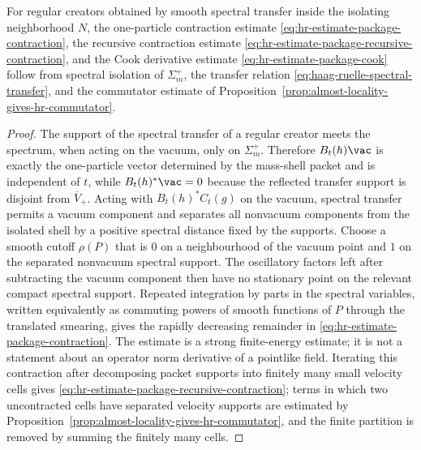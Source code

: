 \begin{proposition}
\label{prop:origin-of-remaining-haag-ruelle-estimates}
For regular creators obtained by smooth spectral transfer inside the
isolating neighborhood \(N\), the one-particle contraction estimate
\eqref{eq:hr-estimate-package-contraction}, the recursive contraction
estimate \eqref{eq:hr-estimate-package-recursive-contraction}, and the Cook
derivative estimate \eqref{eq:hr-estimate-package-cook} follow from spectral
isolation of \(\Sigma_m^+\), the transfer relation
\eqref{eq:haag-ruelle-spectral-transfer}, and the commutator estimate of
Proposition~\ref{prop:almost-locality-gives-hr-commutator}.
\end{proposition}

\begin{proof}
The support of the spectral transfer of a regular creator meets the spectrum,
when acting on the vacuum, only on \(\Sigma_m^+\).  Therefore
\(B_t(h)\vac\) is exactly the one-particle vector determined by the mass-shell
packet and is independent of \(t\), while \(B_t(h)^*\vac=0\) because the
reflected transfer support is disjoint from \(\overline V_+\).  Acting with
\(B_t(h)^*C_t(g)\) on the vacuum, spectral transfer permits a vacuum component
and separates all nonvacuum components from the isolated shell by a positive
spectral distance fixed by the supports.  Choose a smooth cutoff \(\rho(P)\)
that is \(0\) on a neighbourhood of the vacuum point and \(1\) on the
separated nonvacuum spectral support.  The oscillatory factors left after
subtracting the vacuum component then have no stationary point on the relevant
compact spectral support.  Repeated integration by parts in the spectral
variables, written equivalently as commuting powers of smooth functions of
\(P\) through the translated smearing, gives the rapidly decreasing remainder
in \eqref{eq:hr-estimate-package-contraction}.  The estimate is a strong
finite-energy estimate; it is not a statement about an operator norm
derivative of a pointlike field.
Iterating this contraction after decomposing packet supports into finitely
many small velocity cells gives
\eqref{eq:hr-estimate-package-recursive-contraction}; terms in which two
uncontracted cells have separated velocity supports are estimated by
Proposition~\ref{prop:almost-locality-gives-hr-commutator}, and the finite
partition is removed by summing the finitely many cells.


\end{proof}
